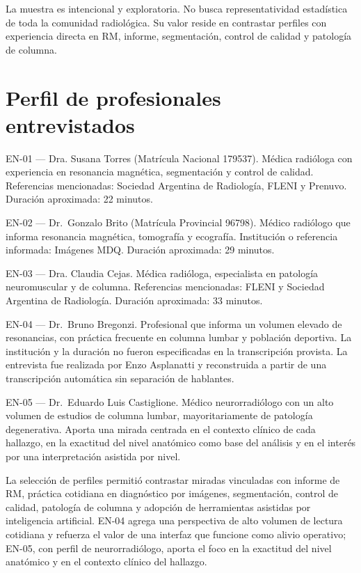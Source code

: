 La muestra es intencional y exploratoria. No busca representatividad estadística de toda la comunidad radiológica. Su valor reside en contrastar perfiles con experiencia directa en RM, informe, segmentación, control de calidad y patología de columna.

\section{Perfil de profesionales entrevistados}

EN-01 — Dra. Susana Torres (Matrícula Nacional 179537). Médica radióloga con experiencia en resonancia magnética, segmentación y control de calidad. Referencias mencionadas: Sociedad Argentina de Radiología, FLENI y Prenuvo. Duración aproximada: 22 minutos.

EN-02 — Dr. Gonzalo Brito (Matrícula Provincial 96798). Médico radiólogo que informa resonancia magnética, tomografía y ecografía. Institución o referencia informada: Imágenes MDQ. Duración aproximada: 29 minutos.

EN-03 — Dra. Claudia Cejas. Médica radióloga, especialista en patología neuromuscular y de columna. Referencias mencionadas: FLENI y Sociedad Argentina de Radiología. Duración aproximada: 33 minutos.

EN-04 — Dr. Bruno Bregonzi. Profesional que informa un volumen elevado de resonancias, con práctica frecuente en columna lumbar y población deportiva. La institución y la duración no fueron especificadas en la transcripción provista. La entrevista fue realizada por Enzo Asplanatti y reconstruida a partir de una transcripción automática sin separación de hablantes.

EN-05 — Dr. Eduardo Luis Castiglione. Médico neurorradiólogo con un alto volumen de estudios de columna lumbar, mayoritariamente de patología degenerativa. Aporta una mirada centrada en el contexto clínico de cada hallazgo, en la exactitud del nivel anatómico como base del análisis y en el interés por una interpretación asistida por nivel.

La selección de perfiles permitió contrastar miradas vinculadas con informe de RM, práctica cotidiana en diagnóstico por imágenes, segmentación, control de calidad, patología de columna y adopción de herramientas asistidas por inteligencia artificial. EN-04 agrega una perspectiva de alto volumen de lectura cotidiana y refuerza el valor de una interfaz que funcione como alivio operativo; EN-05, con perfil de neurorradiólogo, aporta el foco en la exactitud del nivel anatómico y en el contexto clínico del hallazgo.

